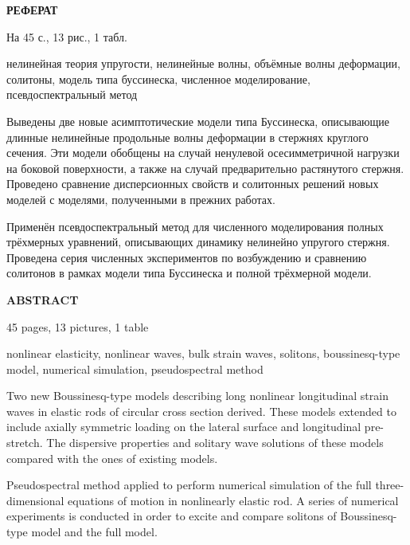 \documentclass[12pt, a4paper]{report}
\begin{document}
\thispagestyle{empty}
\begin{center}
	\textbf{РЕФЕРАТ}
\end{center}

На 45 с., 13 рис., 1 табл.

\vspace{3mm}
\hspace{-\parindent}нелинейная теория упругости, нелинейные волны, объёмные волны деформации, солитоны, модель типа буссинеска, численное моделирование, псевдоспектральный метод
\vspace{3mm}

Выведены две новые асимптотические модели типа Буссинеска, описывающие длинные нелинейные продольные волны деформации в стержнях круглого сечения. Эти модели обобщены на случай ненулевой осесимметричной нагрузки на боковой поверхности, а также на случай предварительно растянутого стержня. Проведено сравнение дисперсионных свойств и солитонных решений новых моделей с моделями, полученными в прежних работах.

Применён псевдоспектральный метод для численного моделирования полных трёхмерных уравнений, описывающих динамику нелинейно упругого стержня. Проведена серия численных экспериментов по возбуждению и сравнению солитонов в рамках модели типа Буссинеска и полной трёхмерной модели.

\vspace{2cm}
\begin{center}
	\textbf{ABSTRACT}
\end{center}

45 pages, 13 pictures, 1 table

\vspace{3mm}
\hspace{-\parindent}nonlinear elasticity, nonlinear waves, bulk strain waves, solitons, boussinesq-type model, numerical simulation, pseudospectral method
\vspace{3mm}

Two new Boussinesq-type models describing long nonlinear longitudinal strain waves in elastic rods of circular cross section derived. These models extended to include axially symmetric loading on the lateral surface and longitudinal pre-stretch. The dispersive properties and solitary wave solutions of these models compared with the ones of existing models.

Pseudospectral method applied to perform numerical simulation of the full three-dimensional equations of motion in nonlinearly elastic rod. A series of numerical experiments is conducted in order to excite and compare solitons of Boussinesq-type model and the full model.
\end{document}
